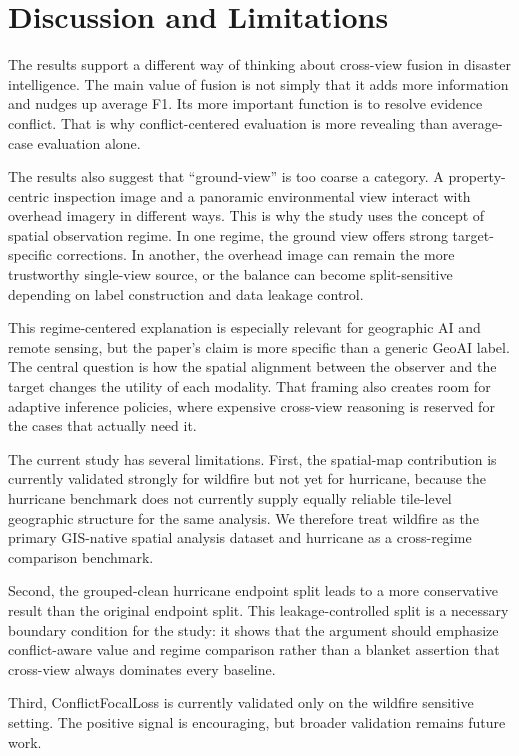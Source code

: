 \documentclass[sigconf]{acmart}
\begin{document}
\section{Discussion and Limitations}

The results support a different way of thinking about cross-view fusion in
disaster intelligence. The main value of fusion is not simply that it adds more
information and nudges up average F1. Its more important function is to resolve
evidence conflict. That is why conflict-centered evaluation is more revealing
than average-case evaluation alone.

The results also suggest that ``ground-view'' is too coarse a category. A
property-centric inspection image and a panoramic environmental view interact
with overhead imagery in different ways. This is why the study uses the concept
of spatial observation regime. In one regime, the ground view offers strong
target-specific corrections. In another, the overhead image can remain the more
trustworthy single-view source, or the balance can become split-sensitive
depending on label construction and data leakage control.

This regime-centered explanation is especially relevant for geographic AI and
remote sensing, but the paper's claim is more specific than a generic GeoAI
label. The central question is how the spatial alignment between the observer
and the target changes the utility of each modality. That framing also creates
room for adaptive inference policies, where expensive cross-view reasoning is
reserved for the cases that actually need it.

The current study has several limitations. First, the spatial-map contribution is
currently validated strongly for wildfire but not yet for hurricane, because
the hurricane benchmark does not currently supply equally reliable tile-level
geographic structure for the same analysis. We therefore treat wildfire as the
primary GIS-native spatial analysis dataset and hurricane as a cross-regime
comparison benchmark.


Second, the grouped-clean hurricane endpoint split leads to a more conservative result
than the original endpoint split. This leakage-controlled split is a necessary
boundary condition for the study: it shows that the argument should emphasize
conflict-aware value and regime comparison rather than a blanket assertion
that cross-view always dominates every baseline.

Third, ConflictFocalLoss is currently validated only on the wildfire sensitive
setting. The positive signal is encouraging, but broader validation remains
future work.
\end{document}

